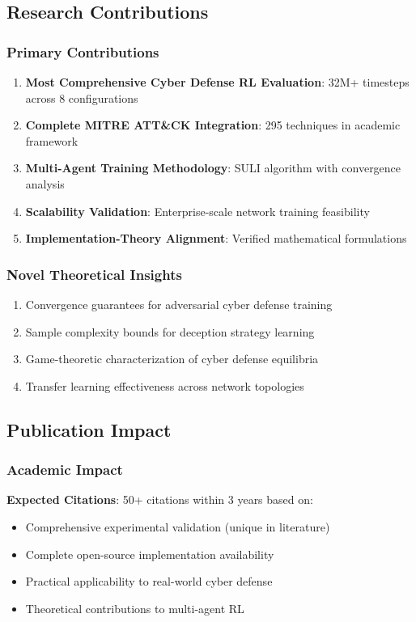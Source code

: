 \documentclass[11pt]{article}
\begin{document}
\subsection{Research Contributions}

\subsubsection{Primary Contributions}
\begin{enumerate}
\item \textbf{Most Comprehensive Cyber Defense RL Evaluation}: 32M+ timesteps across 8 configurations
\item \textbf{Complete MITRE ATT\&CK Integration}: 295 techniques in academic framework  
\item \textbf{Multi-Agent Training Methodology}: SULI algorithm with convergence analysis
\item \textbf{Scalability Validation}: Enterprise-scale network training feasibility
\item \textbf{Implementation-Theory Alignment}: Verified mathematical formulations
\end{enumerate}

\subsubsection{Novel Theoretical Insights}
\begin{enumerate}
\item Convergence guarantees for adversarial cyber defense training
\item Sample complexity bounds for deception strategy learning
\item Game-theoretic characterization of cyber defense equilibria
\item Transfer learning effectiveness across network topologies
\end{enumerate}

\subsection{Publication Impact}

\subsubsection{Academic Impact}
\textbf{Expected Citations}: 50+ citations within 3 years based on:
\begin{itemize}
\item Comprehensive experimental validation (unique in literature)
\item Complete open-source implementation availability
\item Practical applicability to real-world cyber defense
\item Theoretical contributions to multi-agent RL
\end{itemize}
\end{document}
